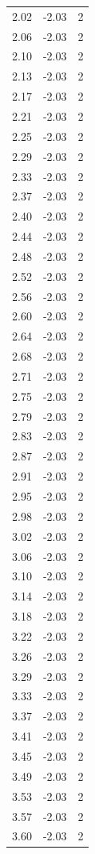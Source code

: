 \begin{longtable}{lrr}
  2.02 & -2.03 & 2 \\
  2.06 & -2.03 & 2 \\
  2.10 & -2.03 & 2 \\
  2.13 & -2.03 & 2 \\
  2.17 & -2.03 & 2 \\
  2.21 & -2.03 & 2 \\
  2.25 & -2.03 & 2 \\
  2.29 & -2.03 & 2 \\
  2.33 & -2.03 & 2 \\
  2.37 & -2.03 & 2 \\
  2.40 & -2.03 & 2 \\
  2.44 & -2.03 & 2 \\
  2.48 & -2.03 & 2 \\
  2.52 & -2.03 & 2 \\
  2.56 & -2.03 & 2 \\
  2.60 & -2.03 & 2 \\
  2.64 & -2.03 & 2 \\
  2.68 & -2.03 & 2 \\
  2.71 & -2.03 & 2 \\
  2.75 & -2.03 & 2 \\
  2.79 & -2.03 & 2 \\
  2.83 & -2.03 & 2 \\
  2.87 & -2.03 & 2 \\
  2.91 & -2.03 & 2 \\
  2.95 & -2.03 & 2 \\
  2.98 & -2.03 & 2 \\
  3.02 & -2.03 & 2 \\
  3.06 & -2.03 & 2 \\
  3.10 & -2.03 & 2 \\
  3.14 & -2.03 & 2 \\
  3.18 & -2.03 & 2 \\
  3.22 & -2.03 & 2 \\
  3.26 & -2.03 & 2 \\
  3.29 & -2.03 & 2 \\
  3.33 & -2.03 & 2 \\
  3.37 & -2.03 & 2 \\
  3.41 & -2.03 & 2 \\
  3.45 & -2.03 & 2 \\
  3.49 & -2.03 & 2 \\
  3.53 & -2.03 & 2 \\
  3.57 & -2.03 & 2 \\
  3.60 & -2.03 & 2 \\

\end{longtable}
